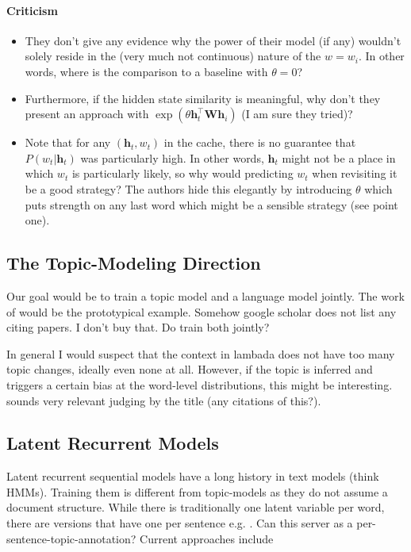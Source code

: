 \documentclass[a4paper,10pt]{article}
\newcommand\h{\mathbf h}
\begin{document}
\paragraph{Criticism}
\begin{itemize}
	\item They don't give any evidence why the power of their model (if any) wouldn't solely reside in the (very much not continuous) nature of the $w=w_i$. In other words, where is the comparison to a baseline with $\theta=0$? 
	\item Furthermore, if the hidden state similarity is meaningful, why don't they present an approach with $\exp (\theta\h_t^\top{\bm W}\h_i)$ (I am sure they tried)?
	\item Note that for any $(\h_t, w_t)$ in the cache, there is no guarantee that $P(w_t|\h_t)$  was particularly high. In other words, $\h_t$ might not be a place in which $w_t$ is particularly likely, so why would predicting $w_t$ when revisiting it be a good strategy? The authors hide this elegantly by introducing $\theta$ which puts strength on any last word which might be a sensible strategy (see point one).	
\end{itemize}

\subsection{The Topic-Modeling Direction}
Our goal would be to train a topic model and a language model jointly. The work of \cite{fu16} would be the prototypical example. Somehow google scholar does not list any citing papers. I don't buy that. Do \cite{liu08} train both jointly?

In general I would suspect that the context in lambada does not have too many topic changes, ideally even none at all. However, if the topic is inferred and triggers a certain bias at the word-level distributions, this might be interesting. \cite{qiang16} sounds very relevant judging by the title (any citations of this?).

\subsection{Latent Recurrent Models}
Latent recurrent sequential models have a long history in text models (think HMMs). Training them is different from topic-models as they do not assume a document structure. While there is traditionally one latent variable per word, there are versions that have one per sentence e.g.\cite{ji16} \cite{zhang16}. Can this server as a per-sentence-topic-annotation? Current approaches include \cite{bayer2014learning} \cite{fraccaro2016} \cite{chungKDGCB15}
\end{document}
